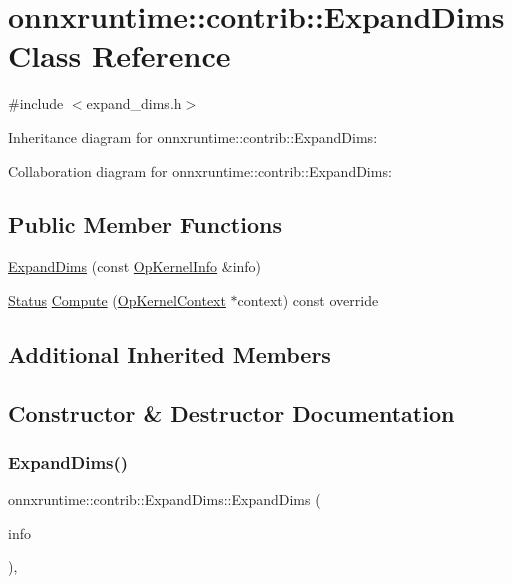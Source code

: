\hypertarget{classonnxruntime_1_1contrib_1_1ExpandDims}{}\section{onnxruntime\+:\+:contrib\+:\+:Expand\+Dims Class Reference}
\label{classonnxruntime_1_1contrib_1_1ExpandDims}


{\ttfamily \#include $<$expand\+\_\+dims.\+h$>$}



Inheritance diagram for onnxruntime\+:\+:contrib\+:\+:Expand\+Dims\+:


Collaboration diagram for onnxruntime\+:\+:contrib\+:\+:Expand\+Dims\+:
\subsection*{Public Member Functions}
\begin{DoxyCompactItemize}
\item 
\mbox{\hyperlink{classonnxruntime_1_1contrib_1_1ExpandDims_a7a8f95ede46252a9a888e3d774558755}{Expand\+Dims}} (const \mbox{\hyperlink{classonnxruntime_1_1OpKernelInfo}{Op\+Kernel\+Info}} \&info)
\item 
\mbox{\hyperlink{classonnxruntime_1_1common_1_1Status}{Status}} \mbox{\hyperlink{classonnxruntime_1_1contrib_1_1ExpandDims_ae8e99883cb96521663ca609cf2d928a3}{Compute}} (\mbox{\hyperlink{classonnxruntime_1_1OpKernelContext}{Op\+Kernel\+Context}} $\ast$context) const override
\end{DoxyCompactItemize}
\subsection*{Additional Inherited Members}


\subsection{Constructor \& Destructor Documentation}
\mbox{\label{classonnxruntime_1_1contrib_1_1ExpandDims_a7a8f95ede46252a9a888e3d774558755}} 
\subsubsection{\texorpdfstring{Expand\+Dims()}{ExpandDims()}}
{\footnotesize\ttfamily onnxruntime\+::contrib\+::\+Expand\+Dims\+::\+Expand\+Dims (\begin{DoxyParamCaption}\item[{const \mbox{\hyperlink{classonnxruntime_1_1OpKernelInfo}{Op\+Kernel\+Info}} \&}]{info }\end{DoxyParamCaption})\hspace{0.3cm}{\ttfamily [inline]}, {\ttfamily [explicit]}}



